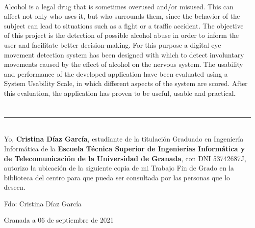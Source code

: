 \vspace{0.7cm}
\\

Alcohol is a legal drug that is sometimes overused and/or misused. This can affect not only who uses it, but who surrounds them, since the behavior of the subject can lead to situations such as a fight or a traffic accident. The objective of this project is the detection of possible alcohol abuse in order to inform the user and facilitate better decision-making. For this purpose a digital eye movement detection system has been designed with which to detect involuntary movements caused by the effect of alcohol on the nervous system. The usability and performance of the developed application have been evaluated using a System Usability Scale, in which different aspects of the system are scored. After this evaluation, the application has proven to be useful, usable and practical.

\newpage

\section*{}
\thispagestyle{empty}

\noindent\rule[-1ex]{\textwidth}{2pt}\\[4.5ex]

Yo, \textbf{Cristina Díaz García}, estudiante de la titulación Graduado en Ingeniería Informática de la \textbf{Escuela Técnica Superior
de Ingenierías Informática y de Telecomunicación de la Universidad de Granada}, con DNI 53742687J, autorizo la
ubicación de la siguiente copia de mi Trabajo Fin de Grado en la biblioteca del centro para que pueda ser
consultada por las personas que lo deseen.

\vspace{6cm}

\begin{center}
  Fdo: Cristina Díaz García

\end{center}

\vspace{2cm}

\begin{flushright}
Granada a 06 de septiembre de 2021
\end{flushright}

\newpage

\section*{}
\thispagestyle{empty}

